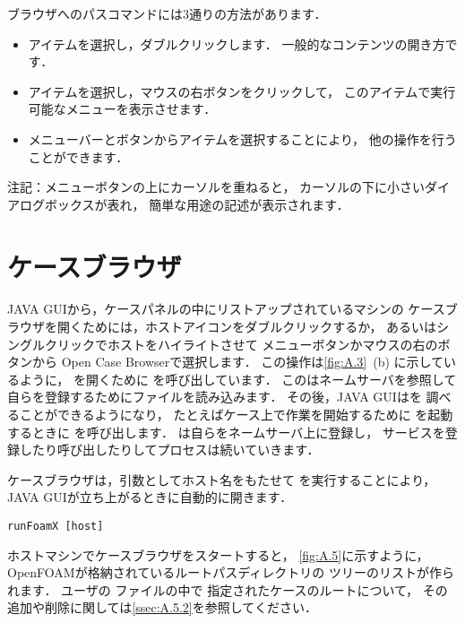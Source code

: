 ブラウザへのパスコマンドには3通りの方法があります．
\begin{itemize}
 \item アイテムを選択し，ダブルクリックします．
       一般的なコンテンツの開き方です．
 \item アイテムを選択し，マウスの右ボタンをクリックして，
       このアイテムで実行可能なメニューを表示させます．
 \item メニューバーとボタンからアイテムを選択することにより，
       他の操作を行うことができます．
\end{itemize}
注記：メニューボタンの上にカーソルを重ねると，
カーソルの下に小さいダイアログボックスが表れ，
簡単な用途の記述が表示されます．



\section{ケースブラウザ}
\label{sec:A.3}
%
%
JAVA GUIから，ケースパネルの中にリストアップされているマシンの
ケースブラウザを開くためには，ホストアイコンをダブルクリックするか，
あるいはシングルクリックでホストをハイライトさせて
メニューボタンかマウスの右のボタンから
Open Case Browserで選択します．
この操作は\autoref{fig:A.3}~(b) に示しているように，
を開くために
を呼び出しています．
このはネームサーバを参照して
自らを登録するためにファイルを読み込みます．
その後，JAVA GUIはを
調べることができるようになり，
たとえばケース上で作業を開始するために
を起動するときに
を呼び出します．
は自らをネームサーバ上に登録し，
サービスを登録したり呼び出したりしてプロセスは続いていきます．

ケースブラウザは，引数としてホスト名をもたせて
を実行することにより，
JAVA GUIが立ち上がるときに自動的に開きます．
\begin{OFterminal}
\begin{verbatim}
runFoamX [host]
\end{verbatim}
\end{OFterminal}
ホストマシンでケースブラウザをスタートすると，
\autoref{fig:A.5}に示すように，
OpenFOAMが格納されているルートパスディレクトリの
ツリーのリストが作られます．
ユーザの ファイルの中で
指定されたケースのルートについて，
その追加や削除に関しては\autoref{ssec:A.5.2}を参照してください．


